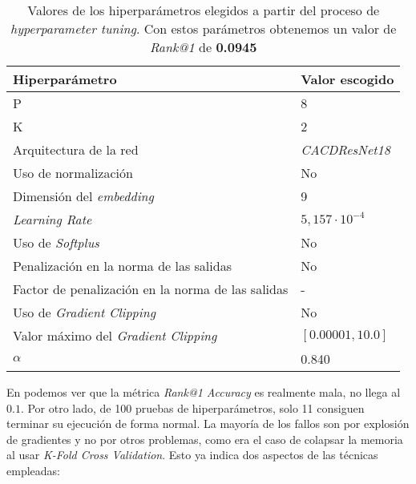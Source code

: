 \begin{table}[H]
\centering
\begin{tabular}{|l|l|}
    \hline
    \textbf{Hiperparámetro}                           & \textbf{Valor escogido} \\
    \hline
    P                                                 & 8                     \\
    K                                                 & 2                     \\
    Arquitectura de la red                            & \textit{CACDResNet18} \\
    Uso de normalización                              & No                    \\
    Dimensión del \textit{embedding}                  & 9                     \\
    \textit{Learning Rate}                            & $5,157 \cdot 10^{-4}$ \\
    Uso de \textit{Softplus}                          & No                    \\
    Penalización en la norma de las salidas           & No                    \\
    Factor de penalización en la norma de las salidas & -                     \\
    Uso de \textit{Gradient Clipping}                 & No                    \\
    Valor máximo del \textit{Gradient Clipping}       & $[0.00001, 10.0]$     \\
    $\alpha$                                          & 0.840                 \\

    \hline
\end{tabular}
\caption{Valores de los hiperparámetros elegidos a partir del proceso de \textit{hyperparameter tuning}. Con estos parámetros obtenemos un valor de \textit{Rank@1} de \textbf{0.0945}}
\label{table:hp_escogidos}
\end{table}

En  podemos ver que la métrica \textit{Rank@1 Accuracy} es realmente mala, no llega al $0.1$. Por otro lado, de 100 pruebas de hiperparámetros, solo 11 consiguen terminar su ejecución de forma normal. La mayoría de los fallos son por explosión de gradientes y no por otros problemas, como era el caso de colapsar la memoria al usar \textit{K-Fold Cross Validation}. Esto ya indica dos aspectos de las técnicas empleadas:

